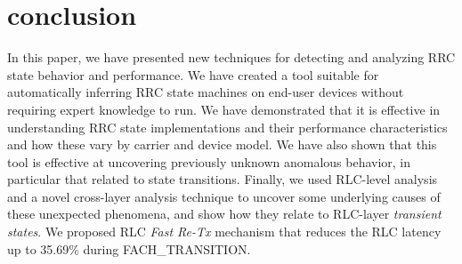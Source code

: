 \section{conclusion}
In this paper, we have presented new techniques for detecting and analyzing RRC state behavior and performance.  We have created a tool suitable for automatically inferring RRC state machines on end-user devices without requiring expert knowledge to run. We have demonstrated that it is effective in understanding RRC state implementations and their performance characteristics and how these vary by carrier and device model.  We have also shown that this tool is effective at uncovering previously unknown anomalous behavior, in particular that related to state transitions.  Finally, we used RLC-level analysis and a novel cross-layer analysis technique to uncover some underlying causes of these unexpected phenomena, and show how they relate to RLC-layer \emph{transient states}.  We proposed RLC \emph{Fast Re-Tx} mechanism that reduces the RLC latency up to 35.69\% during FACH\_{}TRANSITION.
